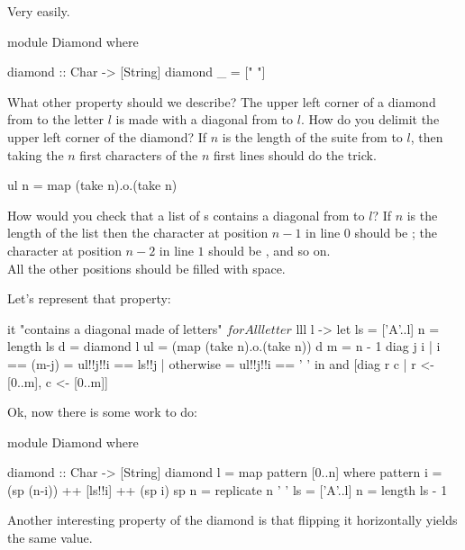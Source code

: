 \answer Very easily.\\
\begin{haskell}[frame=single]
module Diamond
where

diamond :: Char -> [String]
diamond _ = [" "]
\end{haskell}
\askN What other property should we describe? 
\answer The upper left corner of a diamond from  to the letter $l$ is made with a diagonal from  to $l$. 
\askN How do you delimit the upper left corner of the diamond? 
\answer If $n$ is the length of the suite from  to $l$, then taking the $n$ first characters of the $n$ first lines should do the trick. 
\begin{haskell}
ul n = map (take n).o.(take n)
\end{haskell}
\askN How would you check that a list of s contains a diagonal from  to $l$?
\answer If $n$ is the length of the list then the character at position $n-1$ in line $0$ should be ; the character at position $n-2$ in line $1$ should be , and so on.\\All the  other positions should be filled with space.\\
{\center
{}}
\askN Let's represent that property:
\begin{hspec}
it "contains a diagonal made of letters" $ 
    forAll letter $ lll l ->
        let ls = ['A'..l]
            n  = length ls
            d  = diamond l
            ul = (map (take n).o.(take n)) d
            m  = n - 1
            diag j i | i == (m-j) = ul!!j!!i == ls!!j
                     | otherwise  = ul!!j!!i == ' '
        in and [diag r c | r <- [0..m], c <- [0..m]]
\end{hspec}
\answer Ok, now there is some work to do:
\begin{haskell}[frame=single]
module Diamond
where

diamond :: Char -> [String]
diamond l = map pattern [0..n]
    where 
    pattern i = (sp (n-i)) ++ [ls!!i] ++ (sp i)
    sp n = replicate n ' '
    ls = ['A'..l]
    n = length ls - 1
\end{haskell}
\askN Another interesting property of the diamond is that flipping it horizontally yields the same value.
